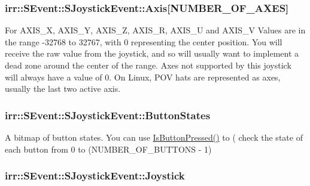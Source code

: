 \subsubsection[{\texorpdfstring{Axis}{Axis}}]{ irr\+::\+S\+Event\+::\+S\+Joystick\+Event\+::\+Axis\mbox{[}N\+U\+M\+B\+E\+R\+\_\+\+O\+F\+\_\+\+A\+X\+ES\mbox{]}}\hypertarget{structirr_1_1SEvent_1_1SJoystickEvent_a1ad2615ffdd8de01b93414228ac3a2d9}{}\label{structirr_1_1SEvent_1_1SJoystickEvent_a1ad2615ffdd8de01b93414228ac3a2d9}
For A\+X\+I\+S\+\_\+X, A\+X\+I\+S\+\_\+Y, A\+X\+I\+S\+\_\+Z, A\+X\+I\+S\+\_\+R, A\+X\+I\+S\+\_\+U and A\+X\+I\+S\+\_\+V Values are in the range -\/32768 to 32767, with 0 representing the center position. You will receive the raw value from the joystick, and so will usually want to implement a dead zone around the center of the range. Axes not supported by this joystick will always have a value of 0. On Linux, P\+OV hats are represented as axes, usually the last two active axis. 
\subsubsection[{\texorpdfstring{Button\+States}{ButtonStates}}]{ irr\+::\+S\+Event\+::\+S\+Joystick\+Event\+::\+Button\+States}\hypertarget{structirr_1_1SEvent_1_1SJoystickEvent_a4fd74c22d62c1613405dc3191ccc5b7c}{}\label{structirr_1_1SEvent_1_1SJoystickEvent_a4fd74c22d62c1613405dc3191ccc5b7c}
A bitmap of button states. You can use \hyperlink{structirr_1_1SEvent_1_1SJoystickEvent_adac7656dc2bc1fedab52d7f84ce52872}{Is\+Button\+Pressed()} to ( check the state of each button from 0 to (N\+U\+M\+B\+E\+R\+\_\+\+O\+F\+\_\+\+B\+U\+T\+T\+O\+NS -\/ 1) 
\subsubsection[{\texorpdfstring{Joystick}{Joystick}}]{ irr\+::\+S\+Event\+::\+S\+Joystick\+Event\+::\+Joystick}\hypertarget{structirr_1_1SEvent_1_1SJoystickEvent_a04424b44a1c3370263afb3af501cae44}{}\label{structirr_1_1SEvent_1_1SJoystickEvent_a04424b44a1c3370263afb3af501cae44}



